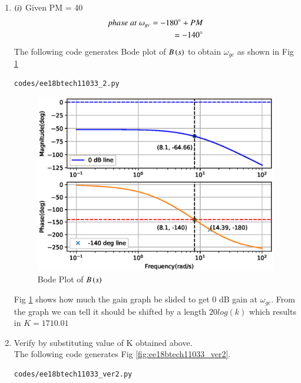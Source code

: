 \begin{enumerate}[label=\thesubsection.\arabic*.,ref=\thesubsection.\theenumi]
\item $\left(i\right)$ Given PM = 40\degree
\\
\solution
\begin{align}
    phase\; at\; \omega_{gc} = -180\degree + PM
    \\
    = -140\degree
\end{align}
The following code generates Bode plot of $B\left(s\right)$ to obtain $\omega_{gc}$ as shown in Fig \ref{fig:ee18btech11033_2}

\begin{lstlisting}
codes/ee18btech11033_2.py
\end{lstlisting}

\begin{figure}[!ht]
\centering
\includegraphics[width=\columnwidth]{./figs/ee18btech11033_2.eps}
\caption{Bode Plot of $B\left(s\right)$}
\label{fig:ee18btech11033_2}
\end{figure}
Fig \ref{fig:ee18btech11033_2} shows how much the gain graph be slided to get 0 dB gain at $\omega_{gc}$.
From the graph we can tell it should be shifted by a length $20log(k)$ which results in  $K =1710.01$ 
\item Verify by substituting value of K obtained above. 
\\
\solution The following code generates Fig \ref{fig:ee18btech11033_ver2}.

\begin{lstlisting}
codes/ee18btech11033_ver2.py
\end{lstlisting}


\end{enumerate}
